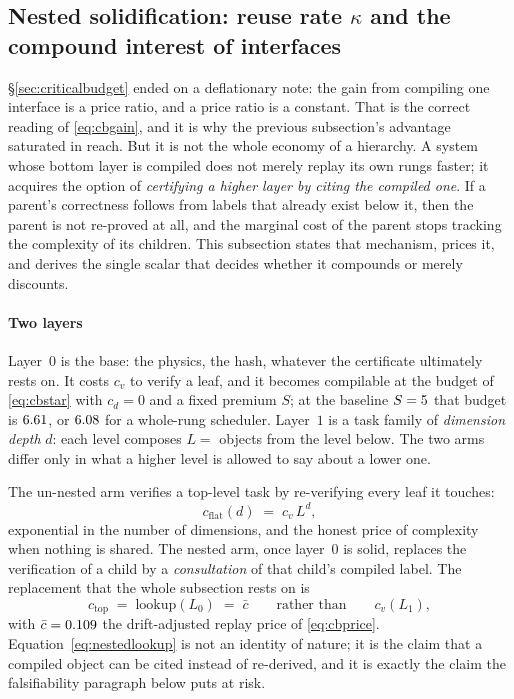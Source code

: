 \documentclass[conference]{IEEEtran}
\theoremstyle{definition}
\begin{document}
\subsection{Nested solidification: reuse rate $\kappa$ and the compound interest
of interfaces}
\label{sec:nested}

\S\ref{sec:criticalbudget} ended on a deflationary note: the gain from compiling
one interface is a price ratio, and a price ratio is a constant. That is the
correct reading of \eqref{eq:cbgain}, and it is why the previous subsection's
advantage saturated in reach. But it is not the whole economy of a hierarchy. A
system whose bottom layer is compiled does not merely replay its own rungs faster;
it acquires the option of \emph{certifying a higher layer by citing the compiled
one}. If a parent's correctness follows from labels that already exist below it,
then the parent is not re-proved at all, and the marginal cost of the parent stops
tracking the complexity of its children. This subsection states that mechanism,
prices it, and derives the single scalar that decides whether it compounds or
merely discounts.

\paragraph{Two layers} Layer~$0$ is the base: the physics, the hash, whatever the
certificate ultimately rests on. It costs $c_v$ to verify a leaf, and it becomes
compilable at the budget of \eqref{eq:cbstar} with $c_d=0$ and a fixed premium
$S$; at the baseline $S=5$ that budget is $\num{6.61}$, or
$\num{6.08}$ for a whole-rung scheduler. Layer~$1$ is a task family of
\emph{dimension depth} $d$: each level composes $L=$\nestedBranch{} objects from
the level below. The two arms differ only in what a higher level is allowed to
say about a lower one.

The un-nested arm verifies a top-level task by re-verifying every leaf it touches:
\begin{equation}
c_{\text{flat}}(d)\;=\;c_v\,L^{d},
\label{eq:nestedflat}
\end{equation}
exponential in the number of dimensions, and the honest price of complexity when
nothing is shared. The nested arm, once layer~$0$ is solid, replaces the
verification of a child by a \emph{consultation} of that child's compiled label.
The replacement that the whole subsection rests on is
\begin{equation}
c_{\text{top}}\;=\;\text{lookup}(L_0)\;=\;\bar c
\qquad\text{rather than}\qquad c_v(L_1),
\label{eq:nestedlookup}
\end{equation}
with $\bar c=0.109$ the drift-adjusted replay price of
\eqref{eq:cbprice}. Equation~\eqref{eq:nestedlookup} is not an identity of nature;
it is the claim that a compiled object can be cited instead of re-derived, and it
is exactly the claim the falsifiability paragraph below puts at risk.
\end{document}
